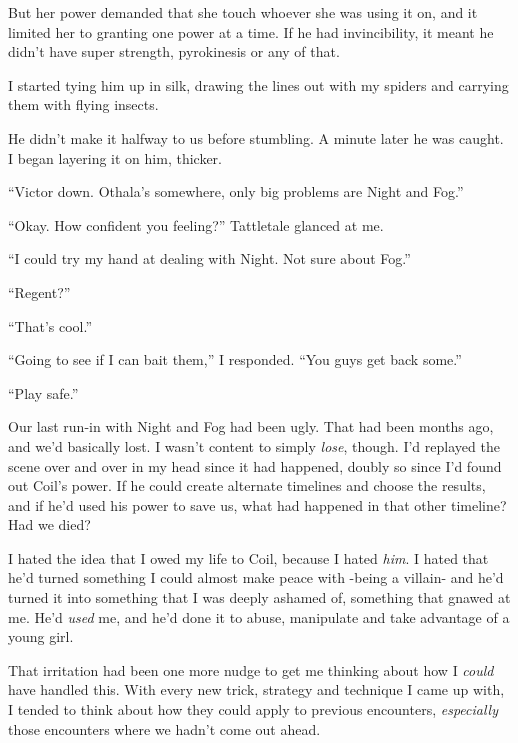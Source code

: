 But her power demanded that she touch whoever she was using it on, and it limited her to granting one power at a time.  If he had invincibility, it meant he didn't have super strength, pyrokinesis or any of that.



I started tying him up in silk, drawing the lines out with my spiders and carrying them with flying insects.



He didn't make it halfway to us before stumbling.  A minute later he was caught.  I began layering it on him, thicker.



``Victor down.  Othala's somewhere, only big problems are Night and Fog.''



``Okay.  How confident you feeling?''  Tattletale glanced at me.



``I could try my hand at dealing with Night.  Not sure about Fog.''



``Regent?''



``That's cool.''



``Going to see if I can bait them,'' I responded.  ``You guys get back some.''



``Play safe.''



Our last run-in with Night and Fog had been ugly.  That had been months ago, and we'd basically lost.  I wasn't content to simply \emph{lose}, though.  I'd replayed the scene over and over in my head since it had happened, doubly so since I'd found out Coil's power.  If he could create alternate timelines and choose the results, and if he'd used his power to save us, what had happened in that other timeline?  Had we died?



I hated the idea that I owed my life to Coil, because I hated \emph{him}.  I hated that he'd turned something I could almost make peace with -being a villain- and he'd turned it into something that I was deeply ashamed of, something that gnawed at me.  He'd \emph{used }me, and he'd done it to abuse, manipulate and take advantage of a young girl.



That irritation had been one more nudge to get me thinking about how I \emph{could} have handled this.  With every new trick, strategy and technique I came up with, I tended to think about how they could apply to previous encounters, \emph{especially }those encounters where we hadn't come out ahead.



